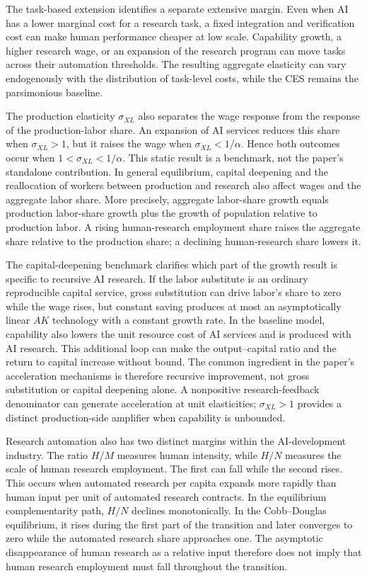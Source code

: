 The task-based extension identifies a separate extensive margin. Even when AI has a
lower marginal cost for a research task, a fixed integration and verification cost
can make human performance cheaper at low scale. Capability growth, a higher research
wage, or an expansion of the research program can move tasks across their automation
thresholds. The resulting aggregate elasticity can vary endogenously with the
distribution of task-level costs, while the CES remains the parsimonious baseline.

The production elasticity $\sigma_{XL}$ also separates the wage response from the
response of the production-labor share. An expansion of AI services reduces this share when
$\sigma_{XL}>1$, but it raises the wage when $\sigma_{XL}<1/\alpha$. Hence both outcomes occur
when $1<\sigma_{XL}<1/\alpha$. This static result is a benchmark, not the paper's
standalone contribution. In general equilibrium, capital deepening and the
reallocation of workers between production and research also affect wages and the
aggregate labor share. More precisely, aggregate labor-share growth equals
production labor-share growth plus the growth of population relative to production
labor. A rising human-research employment share raises the aggregate share relative
to the production share; a declining human-research share lowers it.

The capital-deepening benchmark clarifies which part of the growth result is specific
to recursive AI research. If the labor substitute is an ordinary reproducible capital
service, gross substitution can drive labor's share to zero while the wage rises, but
constant saving produces at most an asymptotically linear $AK$ technology with a
constant growth rate. In the baseline model, capability also lowers the unit resource
cost of AI services and is produced with AI research. This additional loop can make
the output--capital ratio and the return to capital increase without bound. The
common ingredient in the paper's acceleration mechanisms is therefore recursive
improvement, not gross substitution or capital deepening alone. A nonpositive
research-feedback denominator can generate acceleration at unit elasticities;
$\sigma_{XL}>1$ provides a distinct production-side amplifier when capability is
unbounded.

Research automation also has two distinct margins within the AI-development
industry. The ratio $H/M$ measures human intensity, while $H/N$ measures the scale
of human research employment. The first can fall while the second rises. This occurs
when automated research per capita expands more rapidly than human input per unit of
automated research contracts. In the equilibrium complementarity path, $H/N$
declines monotonically. In the Cobb--Douglas equilibrium, it rises during the first
part of the transition and later converges to zero while the automated research
share approaches one. The asymptotic disappearance of human research as a relative
input therefore does not imply that human research employment must fall throughout
the transition.


